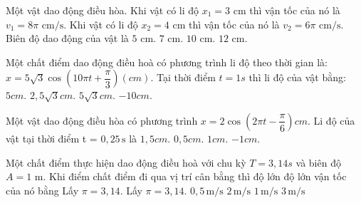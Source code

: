 \begin{ex}
Một vật dao động điều hòa. Khi vật có li độ $x_1 = 3 \text{ cm}$ thì vận tốc của nó là $v_1 = 8\pi \text{ cm/s}$. Khi vật có li độ $x_2 = 4 \text{ cm}$ thì vận tốc của nó là $v_2 = 6\pi \text{ cm/s}$. Biên độ dao động của vật là
\choice
{\True $5 \text{ cm}$.}
{$7 \text{ cm}$.}
{$10 \text{ cm}$.}
{$12 \text{ cm}$.}
\end{ex}

\begin{ex}
Một chất điểm dao động điều hoà có phương trình li độ theo thời gian là: $x=5\sqrt{3}\cos (10\pi t+\dfrac{\pi }{3})(cm).$ Tại thời điểm $t=1s$ thì li độ của vật bằng:
\choice
{$5cm.$}
{\True $2,5\sqrt{3}cm.$}
{$5\sqrt{3}cm.$}
{$-10cm.$}
\end{ex}

\begin{ex}
Một vật dao động điều hòa có phương trình $x=2\cos \left( 2\pi t-\dfrac{\pi }{6} \right)cm$. Li độ của vật tại thời điểm t = $0,25\,\text{s}$ là
\choice
{$1,5cm.$}
{$0,5cm.$}
{\True $1cm.$}
{$-1cm.$}
\end{ex}

\begin{ex}
Một chất điểm thực hiện dao động điều hoà với chu kỳ $T=3{,}14s$ và biên độ $A=1$ m. Khi điểm chất điểm đi qua vị trí cân bằng thì độ lớn độ lớn vận tốc của nó bằng Lấy $\pi=3,14$. Lấy $\pi=3,14$.
\choice
{$0,5\,\mathrm{m/s}$}
{\True $2\,\mathrm{m/s}$}
{$1\,\mathrm{m/s}$}
{$3\,\mathrm{m/s}$}
\end{ex}

